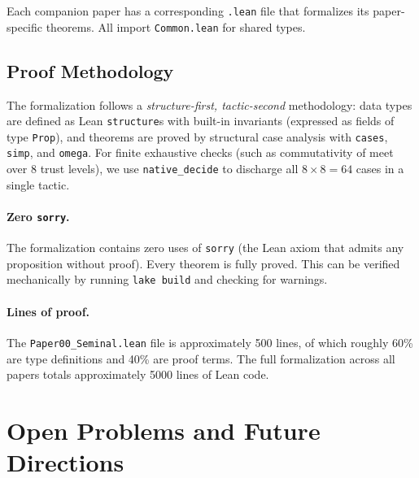 \begin{description}[leftmargin=1.5em,style=nextline]
\item[\texttt{Paper01\_SemanticSites.lean} through \texttt{Paper09\_ProofCarryingPython.lean}]
  Each companion paper has a corresponding \texttt{.lean} file that
  formalizes its paper-specific theorems.  All import
  \texttt{Common.lean} for shared types.
\end{description}

\subsection{Proof Methodology}\label{sec:lean-methodology}

The formalization follows a \emph{structure-first, tactic-second}
methodology: data types are defined as Lean \texttt{structure}s with
built-in invariants (expressed as fields of type \texttt{Prop}), and
theorems are proved by structural case analysis with \texttt{cases},
\texttt{simp}, and \texttt{omega}.  For finite exhaustive checks
(such as commutativity of meet over 8 trust levels), we use
\texttt{native\_decide} to discharge all $8 \times 8 = 64$ cases
in a single tactic.

\paragraph{Zero \texttt{sorry}.}
The formalization contains zero uses of \texttt{sorry} (the Lean
axiom that admits any proposition without proof).  Every theorem
is fully proved.  This can be verified mechanically by running
\texttt{lake build} and checking for warnings.

\paragraph{Lines of proof.}
The \texttt{Paper00\_Seminal.lean} file is approximately 500 lines,
of which roughly 60\% are type definitions and 40\% are proof terms.
The full formalization across all papers totals approximately 5000
lines of Lean code.


\section{Open Problems and Future Directions}\label{sec:future}

